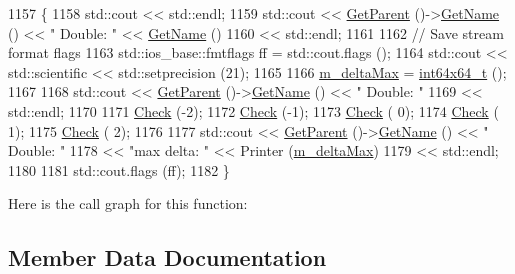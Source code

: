 \begin{DoxyCode}
1157 \{
1158   std::cout << std::endl;
1159   std::cout << \hyperlink{classns3_1_1TestCase_af41db0462b844c9f81838d0e61ecd563}{GetParent} ()->\hyperlink{classns3_1_1TestCase_a28f7bb59669c24dae1c290fc17fc9b62}{GetName} () << \textcolor{stringliteral}{" Double: "} << 
      \hyperlink{classns3_1_1TestCase_a28f7bb59669c24dae1c290fc17fc9b62}{GetName} ()
1160             << std::endl;
1161 
1162   \textcolor{comment}{// Save stream format flags}
1163   std::ios\_base::fmtflags ff = std::cout.flags ();
1164   std::cout << std::scientific << std::setprecision (21);
1165 
1166   \hyperlink{classns3_1_1int64x64_1_1test_1_1Int64x64DoubleTestCase_ab52535c9a92fd852a031900b3ba8b57d}{m\_deltaMax} = \hyperlink{classint64x64__t}{int64x64\_t} ();
1167 
1168   std::cout << \hyperlink{classns3_1_1TestCase_af41db0462b844c9f81838d0e61ecd563}{GetParent} ()->\hyperlink{classns3_1_1TestCase_a28f7bb59669c24dae1c290fc17fc9b62}{GetName} () << \textcolor{stringliteral}{" Double: "}
1169             << std::endl;
1170     
1171   \hyperlink{classns3_1_1int64x64_1_1test_1_1Int64x64DoubleTestCase_a43340a930f4fbdf138cf3d084e6e2ff4}{Check} (-2);
1172   \hyperlink{classns3_1_1int64x64_1_1test_1_1Int64x64DoubleTestCase_a43340a930f4fbdf138cf3d084e6e2ff4}{Check} (-1);
1173   \hyperlink{classns3_1_1int64x64_1_1test_1_1Int64x64DoubleTestCase_a43340a930f4fbdf138cf3d084e6e2ff4}{Check} ( 0);
1174   \hyperlink{classns3_1_1int64x64_1_1test_1_1Int64x64DoubleTestCase_a43340a930f4fbdf138cf3d084e6e2ff4}{Check} ( 1);
1175   \hyperlink{classns3_1_1int64x64_1_1test_1_1Int64x64DoubleTestCase_a43340a930f4fbdf138cf3d084e6e2ff4}{Check} ( 2);
1176 
1177   std::cout << \hyperlink{classns3_1_1TestCase_af41db0462b844c9f81838d0e61ecd563}{GetParent} ()->\hyperlink{classns3_1_1TestCase_a28f7bb59669c24dae1c290fc17fc9b62}{GetName} () << \textcolor{stringliteral}{" Double: "}
1178             << \textcolor{stringliteral}{"max delta: "} << Printer (\hyperlink{classns3_1_1int64x64_1_1test_1_1Int64x64DoubleTestCase_ab52535c9a92fd852a031900b3ba8b57d}{m\_deltaMax})
1179             << std::endl;
1180 
1181   std::cout.flags (ff);
1182 \}
\end{DoxyCode}


Here is the call graph for this function\+:




\subsection{Member Data Documentation}
